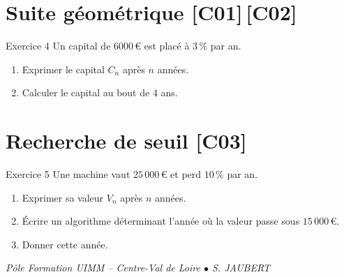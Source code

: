 \documentclass[a4paper,11pt]{article}
\begin{document}
\section{Suite géométrique \hfill {\normalsize\color{uimmred}[C01]\,[C02]}}
\begin{exo}{Exercice 4}
Un capital de $6000\,$€ est placé à $3\,\%$ par an.
\begin{enumerate}[label=\alph*)]
  \item Exprimer le capital $C_n$ après $n$ années.
  \item Calculer le capital au bout de $4$ ans.
\end{enumerate}
\end{exo}

\section{Recherche de seuil \hfill {\normalsize\color{uimmred}[C03]}}
\begin{exo}{Exercice 5}
Une machine vaut $25\,000\,$€ et perd $10\,\%$ par an.
\begin{enumerate}[label=\alph*)]
  \item Exprimer sa valeur $V_n$ après $n$ années.
  \item Écrire un algorithme déterminant l'année où la valeur passe sous $15\,000\,$€.
  \item Donner cette année.
\end{enumerate}
\end{exo}

\vfill
\begin{center}\color{uimmgray}\small
\textit{Pôle Formation UIMM -- Centre-Val de Loire $\bullet$ S. JAUBERT}
\end{center}
\end{document}
